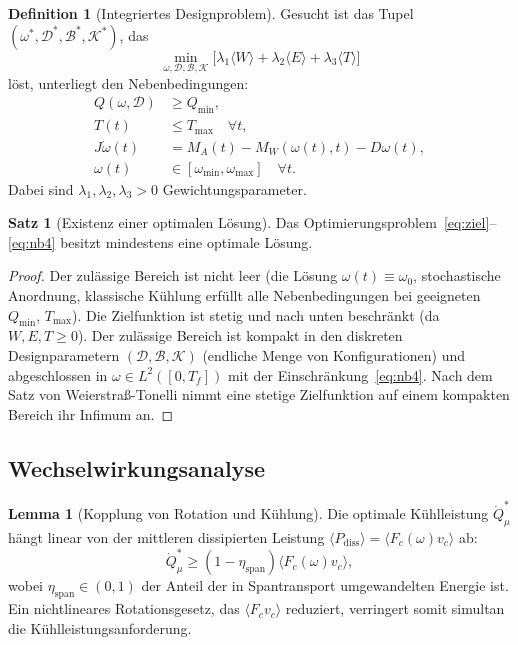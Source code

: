 ﻿\documentclass[a4paper,12pt]{article}
\theoremstyle{definition}
\newtheorem{definition}{Definition}
\newtheorem{satz}{Satz}
\newtheorem{lemma}{Lemma}
\begin{document}
\begin{definition}[Integriertes Designproblem]
\label{def:opt}
Gesucht ist das Tupel $(\omega^*, \mathcal{D}^*, \mathcal{B}^*, \mathcal{K}^*)$, das
\begin{equation}
\label{eq:ziel}
\min_{\omega, \mathcal{D}, \mathcal{B}, \mathcal{K}} \Big[ \lambda_1 \langle W \rangle + \lambda_2 \langle E \rangle + \lambda_3 \langle T \rangle \Big]
\end{equation}
löst, unterliegt den Nebenbedingungen:
\begin{align}
Q(\omega, \mathcal{D}) &\geq Q_{\min}, \label{eq:nb1}\\
T(t) &\leq T_{\max} \quad \forall t, \label{eq:nb2}\\
J\dot{\omega}(t) &= M_A(t) - M_W(\omega(t),t) - D\omega(t), \label{eq:nb3}\\
\omega(t) &\in [\omega_{\min}, \omega_{\max}] \quad \forall t. \label{eq:nb4}
\end{align}
Dabei sind $\lambda_1, \lambda_2, \lambda_3 > 0$ Gewichtungsparameter.
\end{definition}

\begin{satz}[Existenz einer optimalen Lösung]
\label{satz:existenz}
Das Optimierungsproblem~\eqref{eq:ziel}--\eqref{eq:nb4} besitzt mindestens eine optimale Lösung.
\end{satz}

\begin{proof}
Der zulässige Bereich ist nicht leer (die Lösung $\omega(t) \equiv \omega_0$, stochastische
Anordnung, klassische Kühlung erfüllt alle Nebenbedingungen bei geeigneten $Q_{\min}$, $T_{\max}$).
Die Zielfunktion ist stetig und nach unten beschränkt (da $W, E, T \geq 0$). Der zulässige
Bereich ist kompakt in den diskreten Designparametern $(\mathcal{D}, \mathcal{B}, \mathcal{K})$
(endliche Menge von Konfigurationen) und abgeschlossen in $\omega \in L^2([0,T_f])$ mit der
Einschränkung~\eqref{eq:nb4}. Nach dem Satz von Weierstraß-Tonelli nimmt eine stetige
Zielfunktion auf einem kompakten Bereich ihr Infimum an.
\end{proof}

\subsection{Wechselwirkungsanalyse}

\begin{lemma}[Kopplung von Rotation und Kühlung]
\label{lem:kopplung}
Die optimale Kühlleistung $\dot{Q}^*_{\mu}$ hängt linear von der mittleren
dissipierten Leistung $\langle P_{\mathrm{diss}} \rangle = \langle F_c(\omega) v_c \rangle$
ab:
\[
\dot{Q}^*_{\mu} \geq (1-\eta_{\mathrm{span}}) \langle F_c(\omega) v_c \rangle,
\]
wobei $\eta_{\mathrm{span}} \in (0,1)$ der Anteil der in Spantransport umgewandelten Energie ist.
Ein nichtlineares Rotationsgesetz, das $\langle F_c v_c \rangle$ reduziert, verringert
somit simultan die Kühlleistungsanforderung.
\end{lemma}
\end{document}
